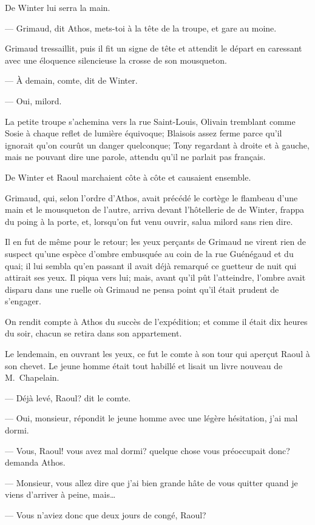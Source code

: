 De Winter lui serra la main.

— Grimaud, dit Athos, mets-toi à la tête de la troupe, et gare au moine.

Grimaud tressaillit, puis il fit un signe de tête et attendit le départ en caressant avec une éloquence silencieuse la crosse de son mousqueton.

— À demain, comte, dit de Winter.

— Oui, milord.

La petite troupe s'achemina vers la rue Saint-Louis, Olivain tremblant comme Sosie à chaque reflet de lumière équivoque; Blaisois assez ferme parce qu'il ignorait qu'on courût un danger quelconque; Tony regardant à droite et à gauche, mais ne pouvant dire une parole, attendu qu'il ne parlait pas français.

De Winter et Raoul marchaient côte à côte et causaient ensemble.

Grimaud, qui, selon l'ordre d'Athos, avait précédé le cortège le flambeau d'une main et le mousqueton de l'autre, arriva devant l'hôtellerie de de Winter, frappa du poing à la porte, et, lorsqu'on fut venu ouvrir, salua milord sans rien dire.

Il en fut de même pour le retour; les yeux perçants de Grimaud ne virent rien de suspect qu'une espèce d'ombre embusquée au coin de la rue Guénégaud et du quai; il lui sembla qu'en passant il avait déjà remarqué ce guetteur de nuit qui attirait ses yeux. Il piqua vers lui; mais, avant qu'il pût l'atteindre, l'ombre avait disparu dans une ruelle où Grimaud ne pensa point qu'il était prudent de s'engager.

On rendit compte à Athos du succès de l'expédition; et comme il était dix heures du soir, chacun se retira dans son appartement.

Le lendemain, en ouvrant les yeux, ce fut le comte à son tour qui aperçut Raoul à son chevet. Le jeune homme était tout habillé et lisait un livre nouveau de M.~Chapelain.

— Déjà levé, Raoul? dit le comte.

— Oui, monsieur, répondit le jeune homme avec une légère hésitation, j'ai mal dormi.

— Vous, Raoul! vous avez mal dormi? quelque chose vous préoccupait donc? demanda Athos.

— Monsieur, vous allez dire que j'ai bien grande hâte de vous quitter quand je viens d'arriver à peine, mais\dots

— Vous n'aviez donc que deux jours de congé, Raoul?

